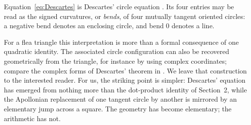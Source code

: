 \documentclass[12pt]{article}
\theoremstyle{definition}
\theoremstyle{remark}
\begin{document}
Equation~\eqref{eq:Descartes} is Descartes' circle equation \cite{Bradford,levrie}. Its four
entries may be read as the signed curvatures, or \emph{bends}, of four
mutually tangent oriented circles: a negative bend denotes an enclosing
circle, and bend \(0\) denotes a line. 

For a flea triangle this interpretation is more than a formal consequence
of one quadratic identity. The associated circle configuration can also be
recovered geometrically from the triangle, for instance by using complex
coordinates; compare the complex forms of Descartes' theorem in
\cite{northshield,tupan}. We leave that construction to the interested
reader. For us, the striking point is simpler: Descartes' equation has
emerged from nothing more than the dot-product identity of Section~2, while
the Apollonian replacement of one tangent circle by another is mirrored by
an elementary jump across a square. The geometry has become elementary; the
arithmetic has not.
\end{document}
